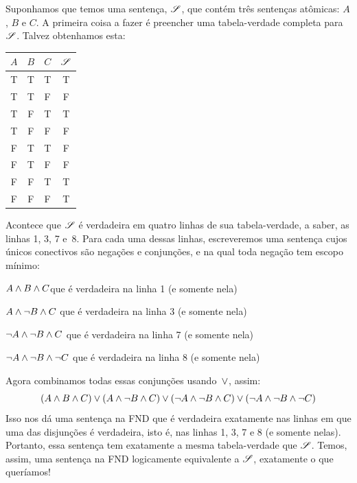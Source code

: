 Suponhamos que temos uma sentença, $\mathscr{S}$, que contém três sentenças atômicas: $A$, $B$ e $C$. A primeira coisa a fazer é preencher uma tabela-verdade completa para~$\mathscr{S}$. Talvez obtenhamos esta:
\begin{center}
\begin{tabular}{c c c | c}
$A$ & $B$ & $C$ & $\mathscr{S}$\\
\hline
 T & T & T & T \\
 T & T & F & F \\
 T & F & T & T \\
 T & F & F & F \\
 F & T & T & F \\
 F & T & F & F \\
 F & F & T & T \\
 F & F & F & T
\end{tabular}
\end{center}
%
%
Acontece que $\mathscr{S}$ é verdadeira em quatro linhas de sua tabela-verdade, a saber, as linhas 1, 3, 7 e~8. Para cada uma dessas linhas, escreveremos uma sentença cujos únicos conectivos são negações e conjunções, e na qual toda negação tem escopo mínimo:
	\begin{compactlist}
		\item $A \wedge B \wedge C$\hfill que é verdadeira na linha 1 (e somente nela)
		\item $A \wedge \neg B \wedge C$ \hfill que é verdadeira na linha 3 (e somente nela)
		\item $\neg A \wedge \neg B \wedge C$ \hfill que é verdadeira na linha 7 (e somente nela)
		\item $\neg A \wedge \neg B \wedge \neg C$ \hfill que é verdadeira na linha 8 (e somente nela)
	\end{compactlist}
Agora combinamos todas essas conjunções usando~$\vee$, assim:
$$(A \wedge B \wedge C) \vee (A \wedge \neg B \wedge C) \vee (\neg A \wedge \neg B \wedge C) \vee (\neg A \wedge \neg B \wedge \neg C)$$\label{longDNF}
Isso nos dá uma sentença na FND que é verdadeira exatamente nas linhas em que uma das disjunções é verdadeira, isto é, nas linhas 1, 3, 7 e 8 (e somente nelas). Portanto, essa sentença tem exatamente a mesma tabela-verdade que $\mathscr{S}$. Temos, assim, uma sentença na FND logicamente equivalente a $\mathscr{S}$, exatamente o que queríamos!

